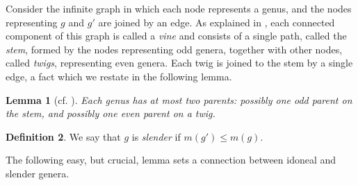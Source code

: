 \documentclass[a4paper]{amsart}
\theoremstyle{definition}
\newtheorem{definition}{Definition}[section]
\theoremstyle{plain}
\newtheorem{lemma}[definition]{Lemma}
\begin{document}
Consider the infinite graph in which each node represents a genus, and the nodes representing \(g\) and \(g'\) are joined by an edge. 
As explained in \cite[§10]{ConwaySloane88}, each connected component of this graph is called a \emph{vine} and consists of a single path, called the \emph{stem}, formed by the nodes representing odd genera, together with other nodes, called \emph{twigs}, representing even genera. Each twig is joined to the stem by a single edge, a fact which we restate in the following lemma.
\begin{lemma}[{cf. \cite[Lemma 3 on p. 280]{ConwaySloane88}}] \label{lem:at.most.two.parents}
    Each genus has at most two parents: possibly one odd parent on the stem, and possibly one even parent on a twig. 
\end{lemma} 

\begin{definition} \label{def:slender}
    We say that \(g\) is \emph{slender} if \(m(g') \leq m(g)\).
\end{definition}


The following easy, but crucial, lemma sets a connection between idoneal and slender genera.
\end{document}
